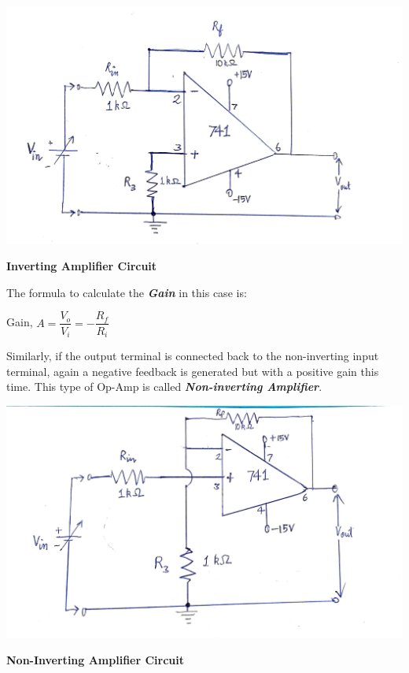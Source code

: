 \begin{center}
    \includegraphics[scale = 0.15]{OPAMP Config/inv.jpg}
\end{center}
\begin{center}
    \textbf{Inverting Amplifier Circuit}
\end{center}
The formula to calculate the \textbf{\emph{Gain}} in this case is:
\begin{center}
    Gain, $A = \dfrac{V_o}{V_{i}} = -\dfrac{R_f}{R_i}$
\end{center}
Similarly, if the output terminal is connected back to the non-inverting input terminal, again a negative feedback is generated but with a positive gain this time. This type of Op-Amp is called \textbf{\emph{Non-inverting Amplifier}}.
\begin{center}
    \includegraphics[scale = 0.15]{OPAMP Config/noninv.jpg}
\end{center}
\begin{center}
    \textbf{Non-Inverting Amplifier Circuit}
\end{center}
